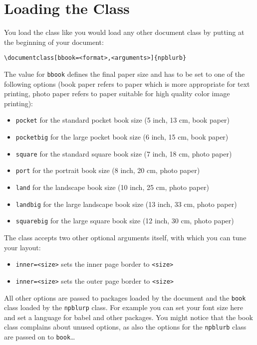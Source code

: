 \documentclass[english,10pt,bbook=pocketbig,inner=1cm,outer=2.5cm]{npblurb}
\begin{document}
\section{Loading the Class}

You load the class like you would load any other document class by putting at the beginning of your document:
\begin{Verbatim}
\documentclass[bbook=<format>,<arguments>]{npblurb}
\end{Verbatim}
The value for {\tt bbook} defines the final paper size and has to be set to one of the following options (book paper refers to paper which is more appropriate for text printing, photo paper refers to paper suitable for high quality color image printing):
\begin{itemize}
\setlength{\itemsep}{0pt plus0pt minus0pt}
\item {\tt pocket} for the standard pocket book size (5 inch, 13 cm, book paper)
\item {\tt pocketbig} for the large pocket book size (6 inch, 15 cm, book paper)
\item {\tt square} for the standard square book size (7 inch, 18 cm, photo paper)
\item {\tt port} for the portrait book size (8 inch, 20 cm, photo paper)
\item {\tt land} for the landscape book size (10 inch, 25 cm, photo paper)
\item {\tt landbig} for the large landscape book size (13 inch, 33 cm, photo paper)
\item {\tt squarebig} for the large square book size (12 inch, 30 cm, photo paper)
\end{itemize}

The class accepts two other optional arguments itself, with which you can tune your layout:
\begin{itemize}
\setlength{\itemsep}{0pt plus0pt minus0pt}
\item {\tt inner=<size>} sets the inner page border to {\tt <size>}
\item {\tt inner=<size>} sets the outer page border to {\tt <size>}
\end{itemize}

All other options are passed to packages loaded by the document and the {\tt book} class loaded by the {\tt npblurp} class. For example you can set your font size here and set a language for babel and other packages. You might notice that the book class complains about unused options, as also the options for the {\tt npblurb} class are passed on to {\tt book}\ldots
\end{document}
